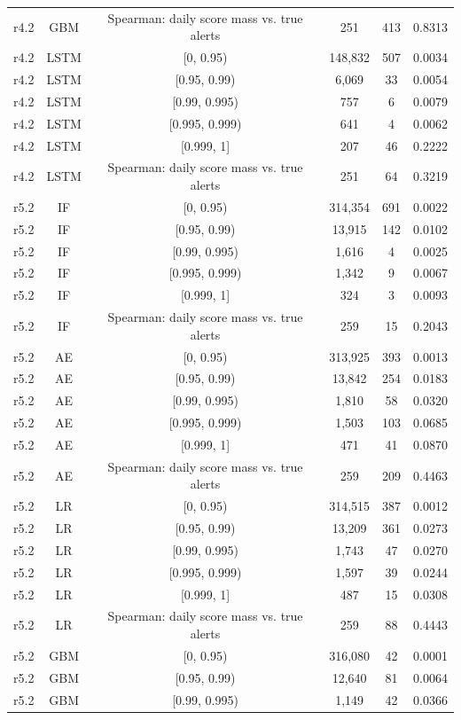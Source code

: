 \documentclass[10pt,onecolumn,letterpaper]{article}
\begin{document}
\begin{table}[!t]
{\begin{tabular}{lccccc}
r4.2 & GBM & Spearman: daily score mass vs. true alerts & 251 & 413 & 0.8313 \\
r4.2 & LSTM & [0, 0.95) & 148,832 & 507 & 0.0034 \\
r4.2 & LSTM & [0.95, 0.99) & 6,069 & 33 & 0.0054 \\
r4.2 & LSTM & [0.99, 0.995) & 757 & 6 & 0.0079 \\
r4.2 & LSTM & [0.995, 0.999) & 641 & 4 & 0.0062 \\
r4.2 & LSTM & [0.999, 1] & 207 & 46 & 0.2222 \\
r4.2 & LSTM & Spearman: daily score mass vs. true alerts & 251 & 64 & 0.3219 \\
r5.2 & IF & [0, 0.95) & 314,354 & 691 & 0.0022 \\
r5.2 & IF & [0.95, 0.99) & 13,915 & 142 & 0.0102 \\
r5.2 & IF & [0.99, 0.995) & 1,616 & 4 & 0.0025 \\
r5.2 & IF & [0.995, 0.999) & 1,342 & 9 & 0.0067 \\
r5.2 & IF & [0.999, 1] & 324 & 3 & 0.0093 \\
r5.2 & IF & Spearman: daily score mass vs. true alerts & 259 & 15 & 0.2043 \\
r5.2 & AE & [0, 0.95) & 313,925 & 393 & 0.0013 \\
r5.2 & AE & [0.95, 0.99) & 13,842 & 254 & 0.0183 \\
r5.2 & AE & [0.99, 0.995) & 1,810 & 58 & 0.0320 \\
r5.2 & AE & [0.995, 0.999) & 1,503 & 103 & 0.0685 \\
r5.2 & AE & [0.999, 1] & 471 & 41 & 0.0870 \\
r5.2 & AE & Spearman: daily score mass vs. true alerts & 259 & 209 & 0.4463 \\
r5.2 & LR & [0, 0.95) & 314,515 & 387 & 0.0012 \\
r5.2 & LR & [0.95, 0.99) & 13,209 & 361 & 0.0273 \\
r5.2 & LR & [0.99, 0.995) & 1,743 & 47 & 0.0270 \\
r5.2 & LR & [0.995, 0.999) & 1,597 & 39 & 0.0244 \\
r5.2 & LR & [0.999, 1] & 487 & 15 & 0.0308 \\
r5.2 & LR & Spearman: daily score mass vs. true alerts & 259 & 88 & 0.4443 \\
r5.2 & GBM & [0, 0.95) & 316,080 & 42 & 0.0001 \\
r5.2 & GBM & [0.95, 0.99) & 12,640 & 81 & 0.0064 \\
r5.2 & GBM & [0.99, 0.995) & 1,149 & 42 & 0.0366 \\

\end{tabular}}
\end{table}
\end{document}
